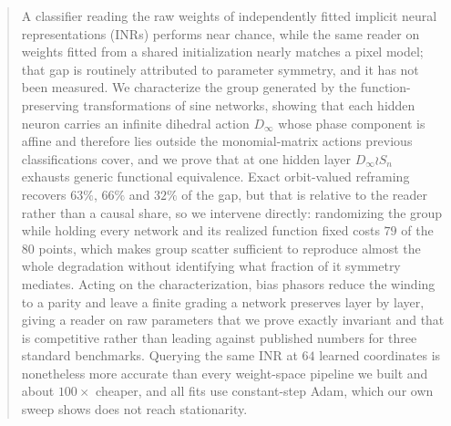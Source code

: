 \documentclass{article}
\theoremstyle{plain}
\theoremstyle{definition}
\theoremstyle{remark}
\newcommand{\Dinf}{D_\infty}
\begin{document}

\printAffiliationsAndNotice{}

\begin{abstract}
A classifier reading the raw weights of independently fitted implicit neural representations (INRs)
performs near chance, while the same reader on weights fitted from a shared initialization nearly
matches a pixel model; that gap is routinely attributed to parameter symmetry, and it has not been
measured. We characterize the group generated by the function-preserving transformations of sine
networks, showing that each hidden neuron carries an infinite dihedral action $\Dinf$ whose phase
component is affine and therefore lies outside the monomial-matrix actions previous classifications
cover, and we prove that at one hidden layer $\Dinf \wr S_n$ exhausts generic functional
equivalence. Exact orbit-valued reframing recovers $63\%$, $66\%$ and $32\%$ of the gap, but that is
relative to the reader rather than a causal share, so we intervene directly: randomizing the group
while holding every network and its realized function fixed costs $79$ of the $80$ points, which
makes group scatter sufficient to reproduce almost the whole degradation without identifying what
fraction of it symmetry mediates. Acting on the characterization, bias phasors reduce the winding to
a parity and leave a finite grading a network preserves layer by layer, giving a reader on raw
parameters that we prove exactly invariant and that is competitive rather than leading against
published numbers for three standard benchmarks. Querying the same INR at $64$ learned coordinates
is nonetheless more accurate than every weight-space pipeline we built and about $100\times$
cheaper, and all fits use constant-step Adam, which our own sweep shows does not reach stationarity.
\end{abstract}
\end{document}
